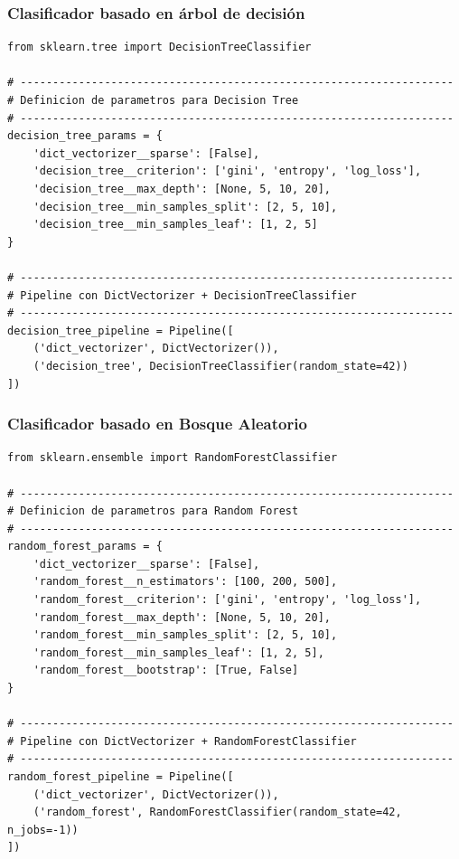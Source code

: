 \documentclass[11pt,a4paper,spanish]{book}
\numberwithin{equation}{chapter}
\numberwithin{figure}{chapter}
\begin{document}
\subsubsection{Clasificador basado en árbol de decisión}


\begin{lstlisting}
from sklearn.tree import DecisionTreeClassifier

# -------------------------------------------------------------------
# Definicion de parametros para Decision Tree
# -------------------------------------------------------------------
decision_tree_params = {
    'dict_vectorizer__sparse': [False],
    'decision_tree__criterion': ['gini', 'entropy', 'log_loss'],
    'decision_tree__max_depth': [None, 5, 10, 20],
    'decision_tree__min_samples_split': [2, 5, 10],
    'decision_tree__min_samples_leaf': [1, 2, 5]
}

# -------------------------------------------------------------------
# Pipeline con DictVectorizer + DecisionTreeClassifier
# -------------------------------------------------------------------
decision_tree_pipeline = Pipeline([
    ('dict_vectorizer', DictVectorizer()),
    ('decision_tree', DecisionTreeClassifier(random_state=42))
])
\end{lstlisting}


\subsubsection{Clasificador basado en Bosque Aleatorio}


\begin{lstlisting}
from sklearn.ensemble import RandomForestClassifier

# -------------------------------------------------------------------
# Definicion de parametros para Random Forest
# -------------------------------------------------------------------
random_forest_params = {
    'dict_vectorizer__sparse': [False],
    'random_forest__n_estimators': [100, 200, 500],   
    'random_forest__criterion': ['gini', 'entropy', 'log_loss'],
    'random_forest__max_depth': [None, 5, 10, 20],
    'random_forest__min_samples_split': [2, 5, 10],
    'random_forest__min_samples_leaf': [1, 2, 5],
    'random_forest__bootstrap': [True, False]
}

# -------------------------------------------------------------------
# Pipeline con DictVectorizer + RandomForestClassifier
# -------------------------------------------------------------------
random_forest_pipeline = Pipeline([
    ('dict_vectorizer', DictVectorizer()),
    ('random_forest', RandomForestClassifier(random_state=42, n_jobs=-1))
])
\end{lstlisting}
\end{document}
